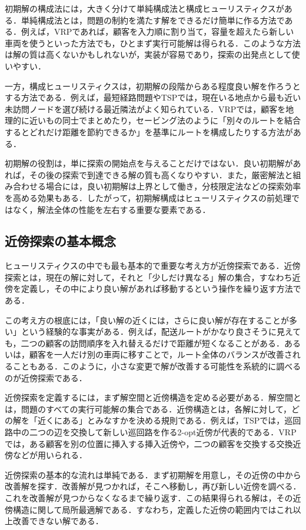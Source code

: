 初期解の構成法には，大きく分けて単純構成法と構成ヒューリスティクスがある．単純構成法とは，問題の制約を満たす解をできるだけ簡単に作る方法である．例えば，VRPであれば，顧客を入力順に割り当て，容量を超えたら新しい車両を使うといった方法でも，ひとまず実行可能解は得られる．このような方法は解の質は高くないかもしれないが，実装が容易であり，探索の出発点として使いやすい．

一方，構成ヒューリスティクスは，初期解の段階からある程度良い解を作ろうとする方法である．例えば，最短経路問題やTSPでは，現在いる地点から最も近い未訪問ノードを選び続ける最近隣法がよく知られている．VRPでは，顧客を地理的に近いもの同士でまとめたり，セービング法のように「別々のルートを結合するとどれだけ距離を節約できるか」を基準にルートを構成したりする方法がある．

初期解の役割は，単に探索の開始点を与えることだけではない．良い初期解があれば，その後の探索で到達できる解の質も高くなりやすい．また，厳密解法と組み合わせる場合には，良い初期解は上界として働き，分枝限定法などの探索効率を高める効果もある．したがって，初期解構成はヒューリスティクスの前処理ではなく，解法全体の性能を左右する重要な要素である．

\subsection{近傍探索の基本概念}

ヒューリスティクスの中でも最も基本的で重要な考え方が近傍探索である．近傍探索とは，現在の解に対して，それと「少しだけ異なる」解の集合，すなわち近傍を定義し，その中により良い解があれば移動するという操作を繰り返す方法である．

この考え方の根底には，「良い解の近くには，さらに良い解が存在することが多い」という経験的な事実がある．例えば，配送ルートがかなり良さそうに見えても，二つの顧客の訪問順序を入れ替えるだけで距離が短くなることがある．あるいは，顧客を一人だけ別の車両に移すことで，ルート全体のバランスが改善されることもある．このように，小さな変更で解が改善する可能性を系統的に調べるのが近傍探索である．

近傍探索を定義するには，まず解空間と近傍構造を定める必要がある．解空間とは，問題のすべての実行可能解の集合である．近傍構造とは，各解に対して，どの解を「近くにある」とみなすかを決める規則である．例えば，TSPでは，巡回路中の二つの辺を交換して新しい巡回路を作る2-opt近傍が代表的である．VRPでは，ある顧客を別の位置に挿入する挿入近傍や，二つの顧客を交換する交換近傍などが用いられる．

近傍探索の基本的な流れは単純である．まず初期解を用意し，その近傍の中から改善解を探す．改善解が見つかれば，そこへ移動し，再び新しい近傍を調べる．これを改善解が見つからなくなるまで繰り返す．この結果得られる解は，その近傍構造に関して局所最適解である．すなわち，定義した近傍の範囲内ではこれ以上改善できない解である．

